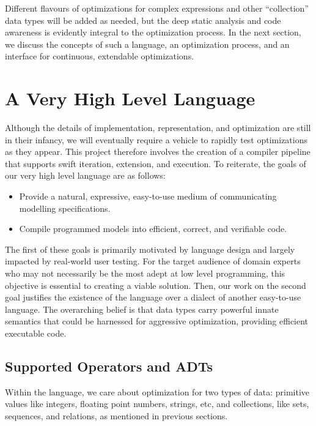 \documentclass{article}
\begin{document}
Different flavours of optimizations for complex expressions and other ``collection'' data types will be added as needed, but the deep static analysis and code awareness is evidently integral to the optimization process. In the next section, we discuss the concepts of such a language, an optimization process, and an interface for continuous, extendable optimizations.

\section{A Very High Level Language}

Although the details of implementation, representation, and optimization are still in their infancy, we will eventually require a vehicle to rapidly test optimizations as they appear. This project therefore involves the creation of a compiler pipeline that supports swift iteration, extension, and execution. To reiterate, the goals of our very high level language are as follows:
\begin{itemize}
  \item Provide a natural, expressive, easy-to-use medium of communicating modelling specifications.
  \item Compile programmed models into efficient, correct, and verifiable code.
\end{itemize}
The first of these goals is primarily motivated by language design and largely impacted by real-world user testing. For the target audience of domain experts who may not necessarily be the most adept at low level programming, this objective is essential to creating a viable solution. Then, our work on the second goal justifies the existence of the language over a dialect of another easy-to-use language. The overarching belief is that data types carry powerful innate semantics that could be harnessed for aggressive optimization, providing efficient executable code.

\subsection{Supported Operators and ADTs}
Within the language, we care about optimization for two types of data: primitive values like integers, floating point numbers, strings, etc, and collections, like sets, sequences, and relations, as mentioned in previous sections.
\end{document}
